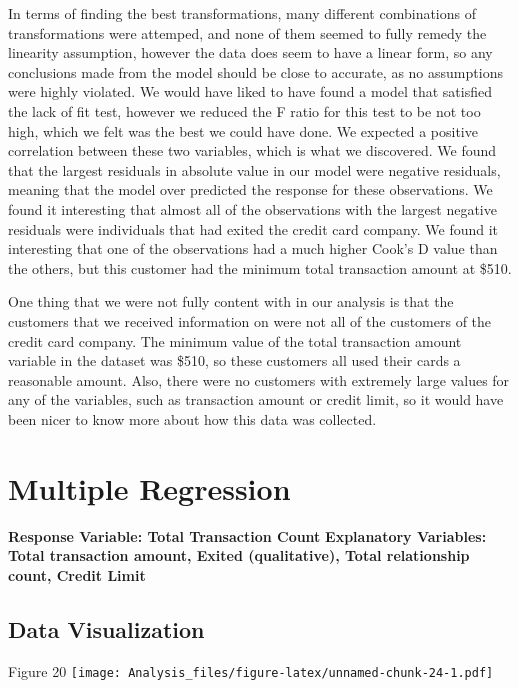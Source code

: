 \documentclass[
]{article}
\begin{document}
In terms of finding the best transformations, many different
combinations of transformations were attemped, and none of them seemed
to fully remedy the linearity assumption, however the data does seem to
have a linear form, so any conclusions made from the model should be
close to accurate, as no assumptions were highly violated. We would have
liked to have found a model that satisfied the lack of fit test, however
we reduced the F ratio for this test to be not too high, which we felt
was the best we could have done. We expected a positive correlation
between these two variables, which is what we discovered. We found that
the largest residuals in absolute value in our model were negative
residuals, meaning that the model over predicted the response for these
observations. We found it interesting that almost all of the
observations with the largest negative residuals were individuals that
had exited the credit card company. We found it interesting that one of
the observations had a much higher Cook's D value than the others, but
this customer had the minimum total transaction amount at \$510.

One thing that we were not fully content with in our analysis is that
the customers that we received information on were not all of the
customers of the credit card company. The minimum value of the total
transaction amount variable in the dataset was \$510, so these customers
all used their cards a reasonable amount. Also, there were no customers
with extremely large values for any of the variables, such as
transaction amount or credit limit, so it would have been nicer to know
more about how this data was collected.

\hypertarget{multiple-regression}{%
\section{Multiple Regression}\label{multiple-regression}}

\textbf{Response Variable: Total Transaction Count} \textbf{Explanatory
Variables: Total transaction amount, Exited (qualitative), Total
relationship count, Credit Limit}

\hypertarget{data-visualization-1}{%
\subsection{Data Visualization}\label{data-visualization-1}}

Figure 20
\texttt{[image: Analysis\_files/figure-latex/unnamed-chunk-24-1.pdf]}
\end{document}
